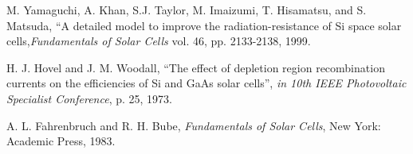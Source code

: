 \documentclass[conference]{./pvsctran}
\begin{document}











%
%
%
\begin{thebibliography}{1}
\small

M. Yamaguchi, A. Khan, S.J. Taylor, M. Imaizumi, T. Hisamatsu, and S. Matsuda, ``A detailed model to improve the radiation-resistance of Si space solar cells,\emph{Fundamentals of Solar Cells} vol. 46, pp. 2133-2138, 1999.

H. J. Hovel and J. M. Woodall, ``The effect of depletion region recombination currents on the efficiencies of Si and GaAs solar cells'', \emph {in 10th IEEE Photovoltaic Specialist Conference}, p. 25, 1973.

A. L. Fahrenbruch and R. H. Bube, \emph{Fundamentals of Solar Cells}, New York: Academic Press, 1983.


\end{thebibliography}





\end{document}
